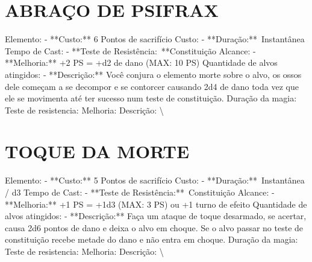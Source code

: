 \documentclass{article}%
\begin{document}
\section{ABRAÇO DE PSIFRAX}%
\label{sec:ABRAODEPSIFRAX}%
Elemento: {-} **Custo:** 6 Pontos de sacrifício\newline%
Custo: {-} **Duração:**~Instantânea\newline%
Tempo de Cast: {-} **Teste de Resistência:~**Constituição\newline%
Alcance: {-} **Melhoria:** +2 PS = +d2 de dano (MAX: 10 PS)\newline%
Quantidade de alvos atingidos: {-} **Descrição:** Você conjura o elemento morte sobre o alvo, os ossos dele começam a se decompor e se contorcer causando 2d4 de dano toda vez que ele se movimenta até ter sucesso num teste de constituição.\newline%
Duração da magia: \newline%
Teste de resistencia: \newline%
Melhoria: \newline%
Descrição: \textbackslash{}

%
\section{TOQUE DA MORTE}%
\label{sec:TOQUEDAMORTE}%
Elemento: {-} **Custo:** 5 Pontos de sacrifício\newline%
Custo: {-} **Duração:**~Instantânea / d3\newline%
Tempo de Cast: {-} **Teste de Resistência:**~Constituição\newline%
Alcance: {-} **Melhoria:** +1 PS = +1d3 (MAX: 3 PS) ou +1 turno de efeito\newline%
Quantidade de alvos atingidos: {-} **Descrição:** Faça um ataque de toque desarmado, se acertar, causa 2d6 pontos de dano e deixa o alvo em choque. Se o alvo passar no teste de constituição recebe metade do dano e não entra em choque.\newline%
Duração da magia: \newline%
Teste de resistencia: \newline%
Melhoria: \newline%
Descrição: \textbackslash{}

%
\end{document}
